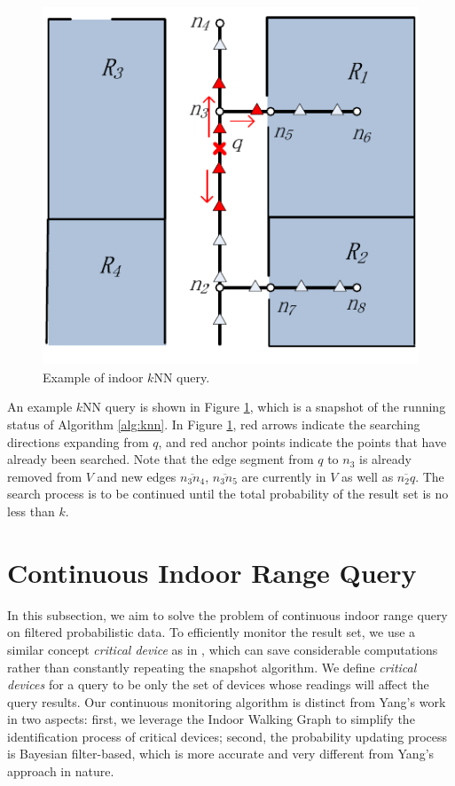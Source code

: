 \documentclass[12pt]{report}
\begin{document}
\begin{figure}[htbp]
\centering
\includegraphics[width=.5\textwidth]{img/knn.pdf}
\caption{\label{fig:knn}
Example of indoor \(k\)NN query.}
\end{figure}

An example \(k\)NN query is shown in Figure \ref{fig:knn}, which is a
snapshot of the running status of Algorithm \ref{alg:knn}.  In Figure
\ref{fig:knn}, red arrows indicate the searching directions expanding
from \(q\), and red anchor points indicate the points that have
already been searched.  Note that the edge segment from \(q\) to
\(n_3\) is already removed from \(V\) and new edges
\(\overline{n_3n_4}\), \(\overline{n_3n_5}\) are currently in
\(V\) as well as \(\overline{n_2q}\).  The search process is to be
continued until the total probability of the result set is no less
than \(k\).

\section{Continuous Indoor Range Query}
\label{sec:org1bac622}

In this subsection, we aim to solve the problem of continuous
indoor range query on filtered probabilistic data.  To efficiently
monitor the result set, we use a similar concept \emph{critical device}
as in \cite{yang2009-scalable}, which can save considerable
computations rather than constantly repeating the snapshot
algorithm.  We define \emph{critical devices} for a query to be only
the set of devices whose readings will affect the query results.
Our continuous monitoring algorithm is distinct from Yang's work
\cite{yang2009-scalable} in two aspects: first, we leverage the
Indoor Walking Graph to simplify the identification process of
critical devices; second, the probability updating process is
Bayesian filter-based, which is more accurate and very different
from Yang's approach in nature.
\end{document}
